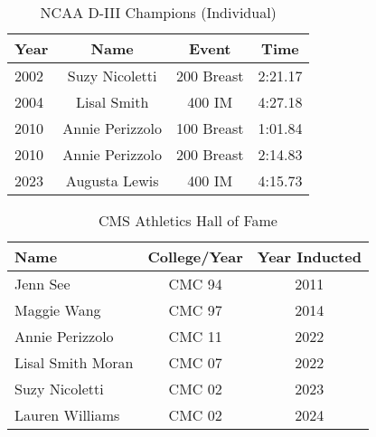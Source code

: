 \begin{table}[htbp]
\centering
\caption*{NCAA D-III Champions (Individual)}
\begin{tabular}{lccc}
\toprule
Year & Name & Event & Time \\
\midrule
2002 & Suzy Nicoletti & 200 Breast & 2:21.17 \\
2004 & Lisal Smith & 400 IM & 4:27.18 \\
2010 & Annie Perizzolo & 100 Breast & 1:01.84 \\
2010 & Annie Perizzolo & 200 Breast & 2:14.83 \\
2023 & Augusta Lewis & 400 IM & 4:15.73 \\
\bottomrule
\end{tabular}
\end{table}

\begin{table}[htbp]
\centering
\caption*{CMS Athletics Hall of Fame}
\begin{tabular}{lcc}
\toprule
Name & College/Year & Year Inducted \\
\midrule
Jenn See & CMC 94 & 2011 \\
Maggie Wang & CMC 97 & 2014 \\
Annie Perizzolo & CMC 11 & 2022 \\
Lisal Smith Moran & CMC 07 & 2022 \\
Suzy Nicoletti & CMC 02 & 2023 \\
Lauren Williams & CMC 02 & 2024 \\
\bottomrule
\end{tabular}
\end{table}

